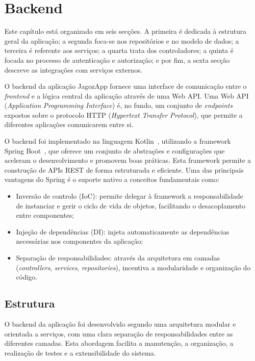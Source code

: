 \chapter{Backend}

Este capítulo está organizado em seis secções. A primeira é dedicada à 
estrutura geral da aplicação; a segunda foca-se nos repositórios e no modelo 
de dados; a terceira é referente aos serviços; a quarta trata dos 
controladores; a quinta é focada no processo de autenticação e autorização; 
e por fim, a sexta secção descreve as integrações com serviços externos.

O backend da aplicação JagozApp fornece uma interface de comunicação entre o 
\textit{frontend} e a lógica central da aplicação através de uma Web API. Uma 
Web API (\textit{Application Programming Interface}) é, no fundo, um conjunto 
de \textit{endpoints} expostos sobre o protocolo HTTP (\textit{Hypertext 
Transfer Protocol}), que permite a diferentes aplicações comunicarem entre 
si.

O backend foi implementado na linguagem Kotlin~\cite{kotlin}, utilizando a 
framework Spring Boot~\cite{springboot}, que oferece um conjunto de abstrações 
e configurações que aceleram o desenvolvimento e promovem boas práticas. Esta 
framework permite a construção de APIs REST de forma estruturada e eficiente. 
Uma das principais vantagens do Spring é o suporte nativo a conceitos 
fundamentais como:

\begin{itemize}
    \item Inversão de controlo (IoC): permite delegar à framework a 
    responsabilidade de instanciar e gerir o ciclo de vida de objetos, 
    facilitando o desacoplamento entre componentes;
    \item Injeção de dependências (DI): injeta automaticamente as dependências 
    necessárias nos componentes da aplicação;
    \item Separação de responsabilidades: através da arquitetura em camadas 
    (\textit{controllers}, \textit{services}, \textit{repositories}), incentiva 
    a modularidade e organização do código.
\end{itemize}

\section{Estrutura}

O backend da aplicação foi desenvolvido segundo uma arquitetura modular e 
orientada a serviços, com uma clara separação de responsabilidades entre as 
diferentes camadas. Esta abordagem facilita a manutenção, a organização, a realização de testes e a 
extensibilidade do sistema.

